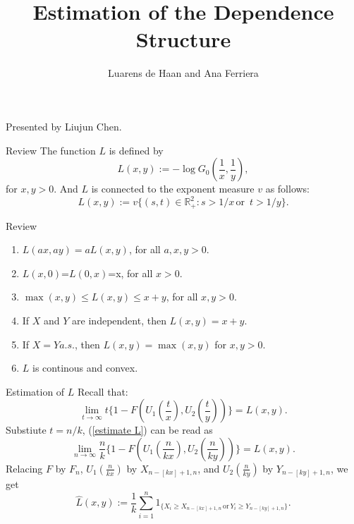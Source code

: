 \documentclass[11pt]{beamer}
\author{Luarens de Haan and Ana Ferriera}
\title{Estimation of the Dependence Structure}
\begin{document}
\begin{frame}
\titlepage
\begin{center}
	Presented by Liujun Chen.
\end{center}
\end{frame}


\begin{frame}{Review}
The function $L$ is defined by
$$L(x,y):=-\log G_0(\frac{1}{x},\frac{1}{y}),$$
for $x,y>0$. And $L$ is connected to the exponent measure $v$ as follows:
\begin{displaymath}
L(x,y):=v\{ (s,t)\in \mathbb{R}_{+}^2: s>1/x \, \text{or }\, t>1/y\}.
\end{displaymath}
\end{frame}

\begin{frame}{Review}
\begin{enumerate}
\item $L(ax,ay)=aL(x,y)$, for all $a,x,y>0$.
\item $L(x,0)$=$L(0,x)$=x, for all $x>0$.
\item $\max(x,y)\le L(x,y)\le x+y $, for all $x,y>0$.
\item If $X$ and $Y$ are independent, then $L(x,y)=x+y.$
\item If $X=Y a.s.$, then $L(x,y)=\max(x,y)$ for $x,y >0$.
\item $L$ is continous and convex.
\end{enumerate}
\end{frame}
\begin{frame}{Estimation of $L$}
Recall that:
\begin{equation}\label{estimate L}
\lim_{t \to \infty}t \{ 1-F(U_1(\frac{t}{x}),U_2(\frac{t}{y}))\}=L(x,y).
\end{equation}
Substiute $t=n/k$,
(\ref{estimate L}) can be read as
\begin{equation}
\lim_{n \to \infty}\frac{n}{k}\{ 1-F(U_1(\frac{n}{kx}),U_2(\frac{n}{ky}))\}=L(x,y).
\end{equation}
Relacing $F$ by $F_n$, $U_1(\frac{n}{kx})$ by $X_{n-[kx]+1,n}$, and  $U_2(\frac{n}{ky})$ by $Y_{n-[ky]+1,n}$, we get
\begin{equation}
\hat{L}(x,y):=\frac{1}{k}\sum_{i=1}^n 1_{\{X_i\ge X_{n-[kx]+1,n}\, \text{or}\, Y_i \ge Y_{n-[ky]+1,n}\}}.
\end{equation}
\end{frame}
\end{document}
